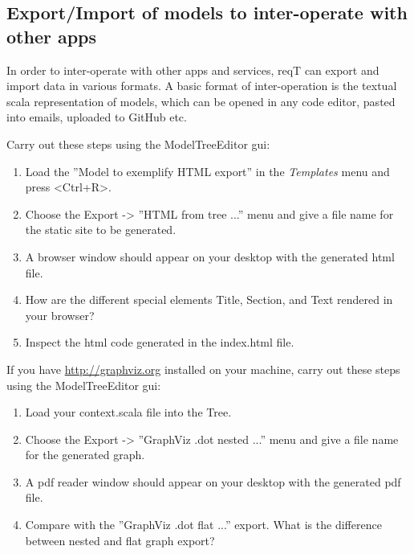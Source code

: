 \documentclass[11pt]{article}
\begin{document}
\subsection{Export/Import of models to inter-operate with other apps}

In order to inter-operate with other apps and services, reqT can export and import data in various formats. A basic format of inter-operation is the textual scala representation of models, which can be opened in any code editor, pasted into emails, uploaded to GitHub etc.   

\begin{framed}
Carry out these steps using the ModelTreeEditor gui:
\begin{enumerate}
\item Load the ''Model to exemplify HTML export'' in the {\it Templates} menu and press <Ctrl+R>.
\item Choose the Export -> ''HTML from tree ...'' menu and give a file name for the static site to be generated.
\item A browser window should appear on your desktop with the generated html file.
\item How are the different special elements Title, Section, and Text rendered in your browser? \newline\newline\underline{\hspace{10cm}}
\item Inspect the html code generated in the index.html file. 
\end{enumerate}
\end{framed}

\begin{framed}
If you have \url{http://graphviz.org} installed on your machine, carry out these steps using the ModelTreeEditor gui:
\begin{enumerate}
\item Load your context.scala file into the Tree.
\item Choose the Export -> ''GraphViz .dot nested ...'' menu and give a file name for the generated graph.
\item A pdf reader window should appear on your desktop with the generated pdf file.
\item Compare with the ''GraphViz .dot flat ...'' export. \newline What is the difference between nested and flat graph export?
\newline\newline\underline{\hspace{10cm}}
\end{enumerate}
\end{framed}
\end{document}
